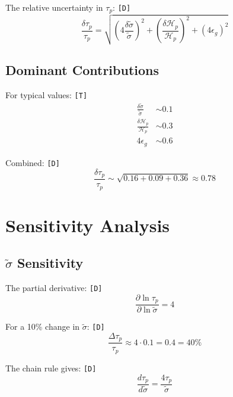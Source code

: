 \documentclass[11pt,a4paper]{article}
\newcommand{\tagD}{\textcolor{green!50!black}{\texttt{[D]}}}
\newcommand{\tagT}{\textcolor{cyan!70!black}{\texttt{[T]}}}
\theoremstyle{definition}
\begin{document}
The relative uncertainty in $\tau_p$: \tagD{}
\begin{equation}
\label{eq:app-unc-total}
\frac{\delta\tau_p}{\tau_p} = \sqrt{\left(4\frac{\delta\tilde{\sigma}}{\tilde{\sigma}}\right)^2 + \left(\frac{\delta\mathcal{H}_p}{\mathcal{H}_p}\right)^2 + (4\epsilon_g)^2}
\end{equation}

\subsection{Dominant Contributions}
\label{app:dominant-unc}

For typical values: \tagT{}
\begin{align}
\label{eq:app-unc-sigma}
\frac{\delta\tilde{\sigma}}{\tilde{\sigma}} &\sim 0.1 \\
\label{eq:app-unc-hp}
\frac{\delta\mathcal{H}_p}{\mathcal{H}_p} &\sim 0.3 \\
\label{eq:app-unc-eps}
4\epsilon_g &\sim 0.6
\end{align}

Combined: \tagD{}
\begin{equation}
\label{eq:app-unc-combined}
\frac{\delta\tau_p}{\tau_p} \sim \sqrt{0.16 + 0.09 + 0.36} \approx 0.78
\end{equation}

\section{Sensitivity Analysis}
\label{app:sensitivity}

\subsection{$\tilde{\sigma}$ Sensitivity}
\label{app:sigma-sens}

The partial derivative: \tagD{}
\begin{equation}
\label{eq:sens-sigma-1}
\frac{\partial \ln\tau_p}{\partial \ln\tilde{\sigma}} = 4
\end{equation}

For a 10\% change in $\tilde{\sigma}$: \tagD{}
\begin{equation}
\label{eq:sens-sigma-2}
\frac{\Delta\tau_p}{\tau_p} \approx 4 \cdot 0.1 = 0.4 = 40\%
\end{equation}

The chain rule gives: \tagD{}
\begin{equation}
\label{eq:sens-sigma-chain}
\frac{d\tau_p}{d\tilde{\sigma}} = \frac{4\tau_p}{\tilde{\sigma}}
\end{equation}
\end{document}
